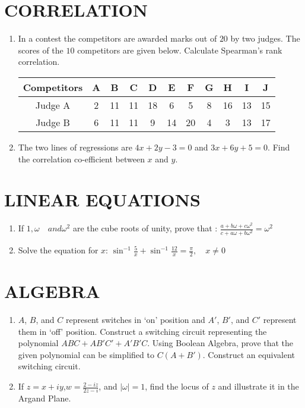 \documentclass[12pt]{article}
\begin{document}
			\section{CORRELATION}
				\begin{enumerate}
			\item  In a contest the competitors are awarded marks out of $20$ by two judges. The scores of the $10$ competitors are given below. Calculate Spearman’s rank correlation.
				\begin{center}
					\begin{tabular}{|c|c|c|c|c|c|c|c|c|c|c|}
					\hline
					Competitors & A & B & C & D & E & F & G & H & I & J \\                         
						\hline
					Judge A & 2 & 11 & 11 & 18 & 6 & 5 & 8 & 16 & 13 & 15 \\                        \hline
					Judge B & 6 & 11 & 11 & 9 & 14 & 20 & 4 & 3 & 13 & 17 \\                        \hline
					 \end{tabular}
				\end{center}
			 
			\item The two lines of regressions are $ 4x + 2y - 3 = 0$ and $3x + 6y + 5     = 0 $. Find the correlation co-efficient between $ x $ and $y .$
				\end{enumerate}
				\section{LINEAR EQUATIONS}
						\begin{enumerate}
							
							\item If $ 1,\omega \quad {and} \omega^2 $ are the cube roots of unity, prove that :
								$\frac{a + b\omega + c\omega^2}{c + a\omega + b\omega^2} = \omega^2 $ 
							\item Solve the equation for $x$:
								$ \sin^{-1} \frac{5}{x} + \sin^{-1} \frac{12}{x} = \frac{\pi}{2}, \quad x \neq 0 $
						\end{enumerate}
						\section{ALGEBRA}
						\begin{enumerate}
							\item $A$, $B$, and $C$ represent switches in ‘on’ position and $A'$, $B'$, and $C'$ represent them in ‘off’ position. Construct a switching circuit representing the polynomial $ABC + AB'C' + A'B'C$. Using Boolean Algebra, prove that the given polynomial can be simplified to $C(A + B')$. Construct an equivalent switching circuit.

							\item If $z = x + iy$,$w = \frac{2 - iz}{2z - i}$, and $|\omega| = 1$, find the locus of $z$ and illustrate it in the Argand Plane. 
						\end{enumerate}
\end{document}
